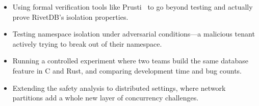 \documentclass[conference,a4paper]{IEEEtran}
\begin{document}
\begin{itemize}
    \item Using formal verification tools like Prusti~\cite{astrauskas2020} to go beyond testing and actually prove RivetDB's isolation properties.
    \item Testing namespace isolation under adversarial conditions---a malicious tenant actively trying to break out of their namespace.
    \item Running a controlled experiment where two teams build the same database feature in C and Rust, and comparing development time and bug counts.
    \item Extending the safety analysis to distributed settings, where network partitions add a whole new layer of concurrency challenges.
\end{itemize}
\end{document}
